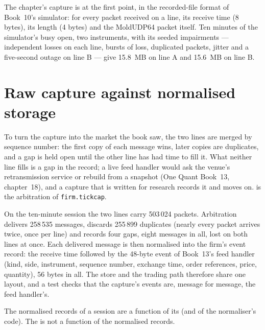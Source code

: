 The chapter's capture is at the first point, in the recorded-file format of Book~10's simulator: for every packet received on a
line, its receive time (8 bytes), its length (4 bytes) and the MoldUDP64 packet itself. Ten minutes of the simulator's busy open,
two instruments, with its seeded impairments --- independent losses on each line, bursts of loss, duplicated packets, jitter and
a five-second outage on line B --- give 15.8~MB on line A and 15.6~MB on line B.

\section{Raw capture against normalised storage}

To turn the capture into the market the book saw, the two lines are merged by sequence number: the first copy of each message
wins, later copies are duplicates, and a gap is held open until the other line has had time to fill it. What neither line fills
is a gap in the record; a live feed handler would ask the venue's retransmission service or rebuild from a snapshot (One Quant
Book~13, chapter~18), and a capture that is written for research records it and moves on.
 is the arbitration of \texttt{firm.tickcap}.

\label{lst:pl:capturing-and-storing-tick-data:arb}

On the ten-minute session the two lines carry 503\,024 packets. Arbitration delivers 258\,535 messages, discards 255\,899
duplicates (nearly every packet arrives twice, once per line) and records four gaps, eight messages in all, lost on both lines at
once. Each delivered message is then normalised into the firm's event record: the receive time followed by the 48-byte event of
Book~13's feed handler (kind, side, instrument, sequence number, exchange time, order references, price, quantity), 56 bytes in
all. The store and the trading path therefore share one layout, and a test checks that the capture's events are, message for
message, the feed handler's.

\begin{proposition}\label{prop:pl:capturing-and-storing-tick-data:sufficient}
The normalised records of a session are a function of its  (and of the normaliser's code). The  is not a
function of the normalised records.
\end{proposition}

